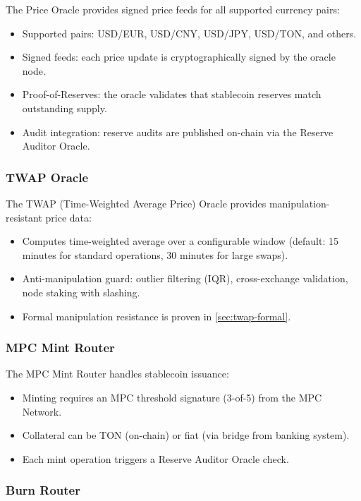 \documentclass[12pt,a4paper]{article}
\theoremstyle{definition}
\theoremstyle{remark}
\begin{document}
The Price Oracle provides signed price feeds for all supported currency pairs:
\begin{itemize}[nosep]
    \item Supported pairs: USD/EUR, USD/CNY, USD/JPY, USD/TON, and others.
    \item Signed feeds: each price update is cryptographically signed by the oracle node.
    \item Proof-of-Reserves: the oracle validates that stablecoin reserves match outstanding supply.
    \item Audit integration: reserve audits are published on-chain via the Reserve Auditor Oracle.
\end{itemize}

\subsubsection{TWAP Oracle}
\label{sec:twap-oracle}

The TWAP (Time-Weighted Average Price) Oracle provides manipulation-resistant price data:
\begin{itemize}[nosep]
    \item Computes time-weighted average over a configurable window (default: 15 minutes for standard operations, 30 minutes for large swaps).
    \item Anti-manipulation guard: outlier filtering (IQR), cross-exchange validation, node staking with slashing.
    \item Formal manipulation resistance is proven in \cref{sec:twap-formal}.
\end{itemize}

\subsubsection{MPC Mint Router}

The MPC Mint Router handles stablecoin issuance:
\begin{itemize}[nosep]
    \item Minting requires an MPC threshold signature (3-of-5) from the MPC Network.
    \item Collateral can be TON (on-chain) or fiat (via bridge from banking system).
    \item Each mint operation triggers a Reserve Auditor Oracle check.
\end{itemize}

\subsubsection{Burn Router}
\end{document}
